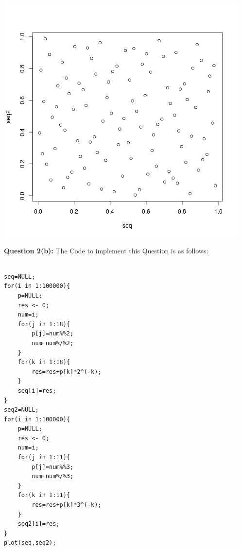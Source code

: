 \documentclass{article}
\begin{document}
\begin{center}
	\includegraphics{Question2_1.png}
\end{center}
\newpage
\textbf{\large Question 2(b):}
The Code to implement this Question is as follows:\\


\lstset {language=R}


\begin{lstlisting}

seq=NULL;
for(i in 1:100000){
	p=NULL;
	res <- 0;
	num=i;
	for(j in 1:18){
		p[j]=num%%2;
		num=num%/%2;
	}
	for(k in 1:18){
		res=res+p[k]*2^(-k);
	}
	seq[i]=res;
}
seq2=NULL;
for(i in 1:100000){
	p=NULL;
	res <- 0;
	num=i;
	for(j in 1:11){
		p[j]=num%%3;
		num=num%/%3;
	}
	for(k in 1:11){
		res=res+p[k]*3^(-k);
	}
	seq2[i]=res;
}
plot(seq,seq2);


\end{lstlisting}
\end{document}

